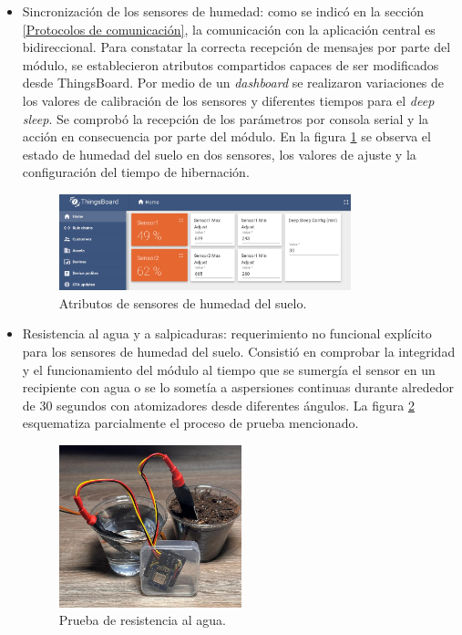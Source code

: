 \begin{itemize}
\item Sincronización de los sensores de humedad: como se indicó en la sección \ref{Protocolos de comunicación}, la comunicación con la aplicación central es bidireccional. Para constatar la correcta recepción de mensajes por parte del módulo, se establecieron atributos compartidos capaces de ser modificados desde ThingsBoard. Por medio de  un \textit{dashboard} se realizaron variaciones de los valores de calibración de los sensores y diferentes tiempos para el \textit{deep sleep}.
Se comprobó la recepción de los parámetros por consola serial y la acción en consecuencia por parte del módulo.
En la figura \ref{fig:soil_calib} se observa el estado de humedad del suelo en dos sensores, los valores de ajuste y la configuración del tiempo de hibernación.

\begin{figure}[!h]
	\centering
	\includegraphics[width=0.80\textwidth]{./Figures/chapter4/soil_calib.jpg}
	\caption[Atributos de sensores de humedad del suelo]{Atributos de sensores de humedad del suelo.}
	\label{fig:soil_calib}
\end{figure}

\item Resistencia al agua y a salpicaduras: requerimiento no funcional explícito para los sensores de humedad del suelo. Consistió en comprobar la integridad y el funcionamiento del módulo al tiempo que se sumergía el sensor en un recipiente con agua o se lo sometía a aspersiones continuas durante alrededor de 30 segundos con atomizadores desde diferentes ángulos.
La figura \ref{fig:soil_test} esquematiza parcialmente el proceso de prueba mencionado.

\begin{figure}[h]
	\centering
	\includegraphics[width=0.50\textwidth]{./Figures/chapter4/soil_testing3.jpg}
	\caption[Prueba de resistencia al agua]{Prueba de resistencia al agua.}
	\label{fig:soil_test}
\end{figure}
  
\end{itemize}








